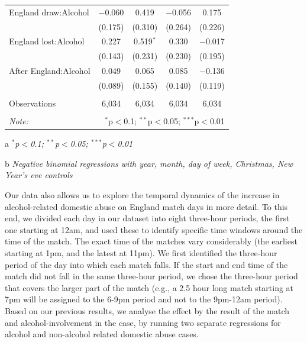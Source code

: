 \documentclass[12pt, letterpaper]{article}
\begin{document}
\begin{table}[!htbp]
{\begin{threeparttable}
\begin{tabular}{@{\extracolsep{5pt}}lcccc}
  England draw:Alcohol & $-$0.060 & 0.419 & $-$0.056 & 0.175 \\ 
  & (0.175) & (0.310) & (0.264) & (0.226) \\ 
  England lost:Alcohol & 0.227 & 0.519$^{*}$ & 0.330 & $-$0.017 \\ 
  & (0.143) & (0.231) & (0.230) & (0.195) \\ 
  After England:Alcohol & 0.049 & 0.065 & 0.085 & $-$0.136 \\ 
  & (0.089) & (0.155) & (0.140) & (0.119) \\ 
 \hline \\[-1.8ex] 
Observations & 6,034 & 6,034 & 6,034 & 6,034 \\ 
\hline 
\hline \\[-1.8ex] 
\textit{Note:}  & \multicolumn{4}{r}{$^{*}$p$<$0.1; $^{**}$p$<$0.05; $^{***}$p$<$0.01} \\ 
\end{tabular} 
\begin{tablenotes}
      \item[a] \textit{$^{*}$p$<$0.1; $^{**}$p$<$0.05; $^{***}$p$<$0.01}
      \item[b] \textit{Negative binomial regressions with year, month, day of week, Christmas, New Year's eve controls}
    \end{tablenotes}
\end{threeparttable} }
\end{table}

Our data also allows us to explore the temporal dynamics of the increase in alcohol-related domestic abuse on England match days in more detail. To this end, we divided each day in our dataset into eight three-hour periods, the first one starting at 12am, and used these to identify specific time windows around the time of the match. The exact time of the matches vary considerably (the earliest starting at 1pm, and the latest at 11pm). We first identified the three-hour period of the day into which each match falls. If the start and end time of the match did not fall in the same three-hour period, we chose the three-hour period that covers the larger part of the match (e.g., a 2.5 hour long match starting at 7pm will be assigned to the 6-9pm period and not to the 9pm-12am period). Based on our previous results, we analyse the effect by the result of the match and alcohol-involvement in the case, by running two separate regressions for alcohol and non-alcohol related domestic abuse cases.
\end{document}

